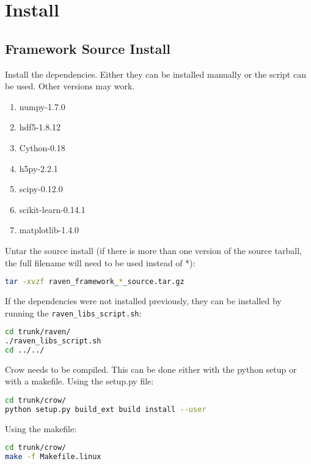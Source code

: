 \section{Install}

\subsection{Framework Source Install}

Install the dependencies.  Either they can be installed manually or the script can be used.  Other versions may work.

\begin{enumerate}
\item numpy-1.7.0
\item hdf5-1.8.12
\item Cython-0.18
\item h5py-2.2.1
\item scipy-0.12.0
\item scikit-learn-0.14.1
\item matplotlib-1.4.0
\end{enumerate}

Untar the source install (if there is more than one version of the
source tarball, the full filename will need to be used instead of *):

\begin{lstlisting}[language=bash]
tar -xvzf raven_framework_*_source.tar.gz
\end{lstlisting}

If the dependencies were not installed previously, they can be installed by
running the \verb'raven_libs_script.sh':

\begin{lstlisting}[language=bash]
cd trunk/raven/
./raven_libs_script.sh
cd ../../
\end{lstlisting}

Crow needs to be compiled.  This can be done either with the python
setup or with a makefile.  Using the setup.py file:

\begin{lstlisting}[language=bash]
cd trunk/crow/
python setup.py build_ext build install --user
\end{lstlisting}

Using the makefile:

\begin{lstlisting}[language=bash]
cd trunk/crow/
make -f Makefile.linux
\end{lstlisting}

